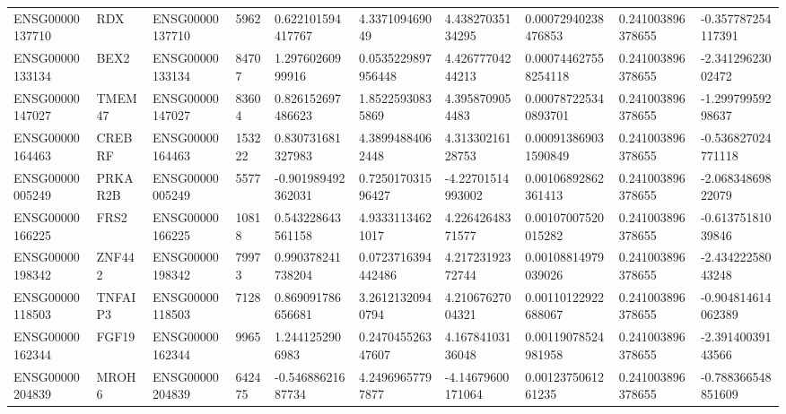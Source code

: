 \begin{tabular}{@{}llllllllll@{}}
ENSG00000137710 & RDX & ENSG00000137710 & 5962 & 0.622101594417767 & 4.337109469049 & 4.43827035134295 & 0.00072940238476853 & 0.241003896378655 & -0.357787254117391 \\
ENSG00000133134 & BEX2 & ENSG00000133134 & 84707 & 1.29760260999916 & 0.0535229897956448 & 4.42677704244213 & 0.000744627558254118 & 0.241003896378655 & -2.34129623002472 \\
ENSG00000147027 & TMEM47 & ENSG00000147027 & 83604 & 0.826152697486623 & 1.85225930835869 & 4.3958709054483 & 0.000787225340893701 & 0.241003896378655 & -1.29979959298637 \\
ENSG00000164463 & CREBRF & ENSG00000164463 & 153222 & 0.830731681327983 & 4.38994884062448 & 4.31330216128753 & 0.000913869031590849 & 0.241003896378655 & -0.536827024771118 \\
ENSG00000005249 & PRKAR2B & ENSG00000005249 & 5577 & -0.901989492362031 & 0.725017031596427 & -4.22701514993002 & 0.00106892862361413 & 0.241003896378655 & -2.06834869822079 \\
ENSG00000166225 & FRS2 & ENSG00000166225 & 10818 & 0.543228643561158 & 4.93331134621017 & 4.22642648371577 & 0.00107007520015282 & 0.241003896378655 & -0.61375181039846 \\
ENSG00000198342 & ZNF442 & ENSG00000198342 & 79973 & 0.990378241738204 & 0.0723716394442486 & 4.21723192372744 & 0.00108814979039026 & 0.241003896378655 & -2.43422258043248 \\
ENSG00000118503 & TNFAIP3 & ENSG00000118503 & 7128 & 0.869091786656681 & 3.26121320940794 & 4.21067627004321 & 0.00110122922688067 & 0.241003896378655 & -0.904814614062389 \\
ENSG00000162344 & FGF19 & ENSG00000162344 & 9965 & 1.2441252906983 & 0.247045526347607 & 4.16784103136048 & 0.00119078524981958 & 0.241003896378655 & -2.39140039143566 \\
ENSG00000204839 & MROH6 & ENSG00000204839 & 642475 & -0.54688621687734 & 4.24969657797877 & -4.14679600171064 & 0.0012375061261235 & 0.241003896378655 & -0.788366548851609 \\
\bottomrule
\end{tabular}
\endgroup
